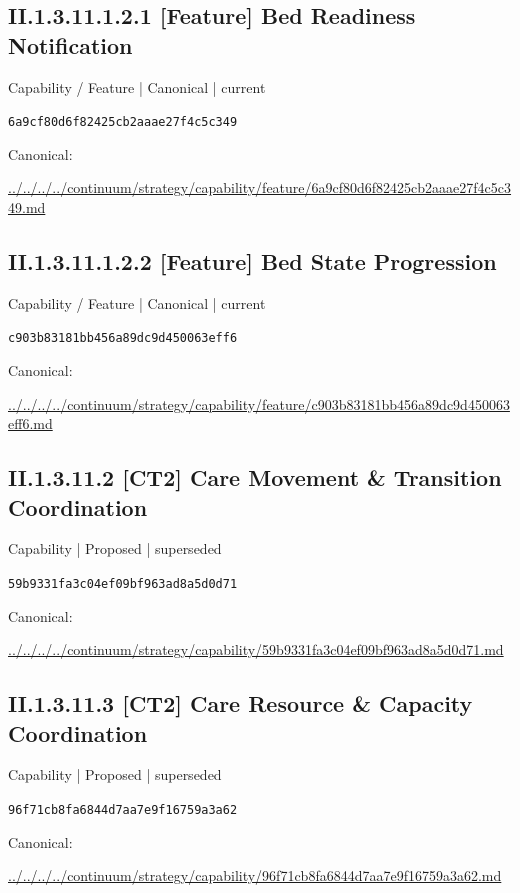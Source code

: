 \documentclass[10pt,a4paper]{article}
\begin{document}
\subsection*{II.1.3.11.1.2.1 [Feature] Bed Readiness Notification}
{\small Capability / Feature | Canonical | current}\par
\texttt{6a9cf80d6f82425cb2aaae27f4c5c349}\par
Canonical: \par
{\footnotesize\url{../../../../continuum/strategy/capability/feature/6a9cf80d6f82425cb2aaae27f4c5c349.md}}\par
\subsection*{II.1.3.11.1.2.2 [Feature] Bed State Progression}
{\small Capability / Feature | Canonical | current}\par
\texttt{c903b83181bb456a89dc9d450063eff6}\par
Canonical: \par
{\footnotesize\url{../../../../continuum/strategy/capability/feature/c903b83181bb456a89dc9d450063eff6.md}}\par
\subsection*{II.1.3.11.2 [CT2] Care Movement \& Transition Coordination}
{\small Capability | Proposed | superseded}\par
\texttt{59b9331fa3c04ef09bf963ad8a5d0d71}\par
Canonical: \par
{\footnotesize\url{../../../../continuum/strategy/capability/59b9331fa3c04ef09bf963ad8a5d0d71.md}}\par
\subsection*{II.1.3.11.3 [CT2] Care Resource \& Capacity Coordination}
{\small Capability | Proposed | superseded}\par
\texttt{96f71cb8fa6844d7aa7e9f16759a3a62}\par
Canonical: \par
{\footnotesize\url{../../../../continuum/strategy/capability/96f71cb8fa6844d7aa7e9f16759a3a62.md}}\par
\end{document}
